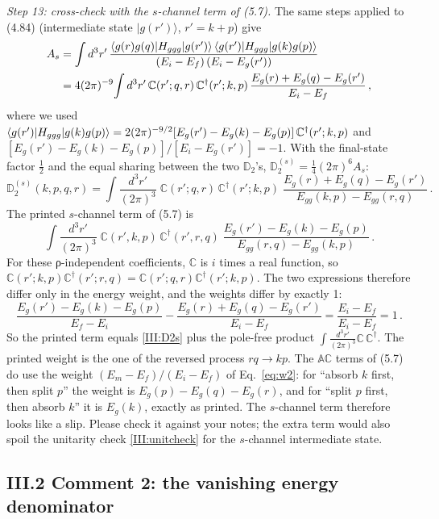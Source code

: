 \emph{Step 13: cross-check with the $s$-channel term of (5.7).} The same steps applied to (4.84) (intermediate state $|g(r')\rangle$, $r'=k+p$) give
\begin{align*}
A_s&=\int d^3r'\,\frac{\langle g(r)g(q)|H_{ggg}|g(r')\rangle\,\langle g(r')|H_{ggg}|g(k)g(p)\rangle}{(E_i-E_f)\,(E_i-E_g(r'))}\\
&=4(2\pi)^{-9}\!\int d^3r'\,\mathbb C(r';q,r)\,\mathbb C^\dagger(r';k,p)\,\frac{E_g(r)+E_g(q)-E_g(r')}{E_i-E_f}\,,
\end{align*}
where we used $\langle g(r')|H_{ggg}|g(k)g(p)\rangle=2(2\pi)^{-9/2}[E_g(r')-E_g(k)-E_g(p)]\,\mathbb C^\dagger(r';k,p)$ and $[E_g(r')-E_g(k)-E_g(p)]/[E_i-E_g(r')]=-1$. With the final-state factor $\frac12$ and the equal sharing between the two $\mathbb D_2$'s, $\mathbb D_2^{(s)}=\frac14(2\pi)^6A_s$:
\begin{equation}
\mathbb D_2^{(s)}(k,p,q,r)=\int\!\frac{d^3r'}{(2\pi)^3}\;\mathbb C(r';q,r)\,\mathbb C^\dagger(r';k,p)\;\frac{E_g(r)+E_g(q)-E_g(r')}{E_{gg}(k,p)-E_{gg}(r,q)}\,.
\label{III:D2s}
\end{equation}
The printed $s$-channel term of (5.7) is
\[
\int\!\frac{d^3r'}{(2\pi)^3}\;\mathbb C(r',k,p)\,\mathbb C^\dagger(r',r,q)\;\frac{E_g(r')-E_g(k)-E_g(p)}{E_{gg}(r,q)-E_{gg}(k,p)}\,.
\]
For these ρ-independent coefficients, $\mathbb C$ is $i$ times a real function, so $\mathbb C(r';k,p)\mathbb C^\dagger(r';r,q)=\mathbb C(r';q,r)\mathbb C^\dagger(r';k,p)$. The two expressions therefore differ only in the energy weight, and the weights differ by exactly 1:
\[
\frac{E_g(r')-E_g(k)-E_g(p)}{E_f-E_i}-\frac{E_g(r)+E_g(q)-E_g(r')}{E_i-E_f}=\frac{E_i-E_f}{E_i-E_f}=1\,.
\]
So the printed term equals \eqref{III:D2s} plus the pole-free product $\int\frac{d^3r'}{(2\pi)^3}\mathbb C\,\mathbb C^\dagger$. The printed weight is the one of the reversed process $rq\to kp$. The $\mathbb A\mathbb C$ terms of (5.7) do use the weight $(E_m-E_f)/(E_i-E_f)$ of Eq.~\eqref{eq:w2}: for ``absorb $k$ first, then split $p$'' the weight is $E_g(p)-E_g(q)-E_g(r)$, and for ``split $p$ first, then absorb $k$'' it is $E_g(k)$, exactly as printed. The $s$-channel term therefore looks like a slip. Please check it against your notes; the extra term would also spoil the unitarity check \eqref{III:unitcheck} for the $s$-channel intermediate state.

\subsection*{III.2 Comment 2: the vanishing energy denominator}

